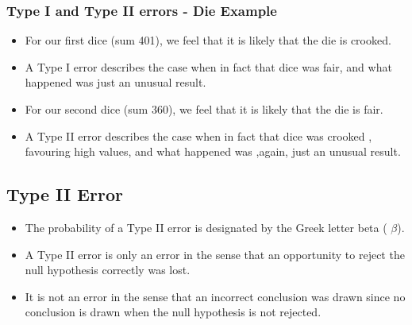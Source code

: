 \begin{frame}
\frametitle{Type I and Type II errors - Die Example}
\begin{itemize}
\item For our first dice (sum 401), we feel that it is likely that the die is crooked.
\item A Type I error describes the case when in fact that dice was fair, and what happened was just an unusual result.
\item For our second dice (sum 360), we feel that it is likely that the die is fair.
\item A Type II error describes the case when in fact that dice was crooked , favouring high values, and what happened was ,again, just an unusual result.
\end{itemize}
\end{frame}









\subsection{Type II Error}
\begin{itemize}

\item The probability of a Type II error is designated by the Greek letter beta ( $\beta$).
\item A Type II error is only an error in the sense that an opportunity to reject the null hypothesis correctly was lost.
\item It is not an error in the sense that an incorrect conclusion was drawn since no conclusion is drawn when the null hypothesis is not rejected.
\end{itemize}


